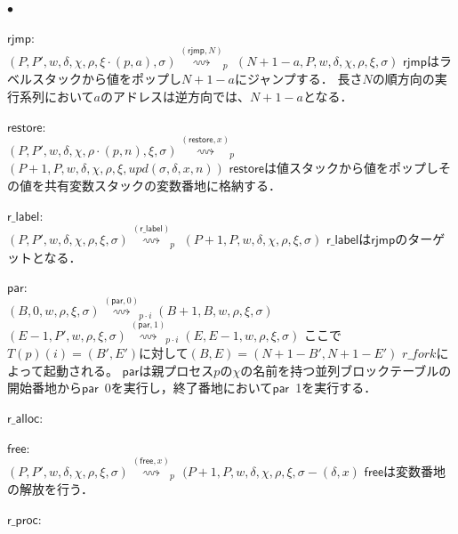 \documentclass[submit,PRO]{ipsj}
\newcommand{\bcode}[1]{$\mathsf{#1}$}
\newcommand{\brightarrow}[1]{\stackrel{#1}{\rightsquigarrow}}
\begin{document}
\begin{list}%
 {$\bullet$} %
 {} %
 \item \bcode{rjmp}:\\
$(P,P',w,\delta,\chi,\rho,\xi\cdot(p,a),\sigma)\brightarrow{(\mathsf{rjmp},N)}_p$\newline
\qquad$(N+1-a,P,w,\delta,\chi,\rho,\xi,\sigma)$\newline
\bcode{rjmp}はラベルスタックから値をポップし$N+1-a$にジャンプする．
長さ$N$の順方向の実行系列において$a$のアドレスは逆方向では、$N+1-a$となる．
\item \bcode{restore}:\\
$(P,P',w,\delta,\chi,\rho\cdot(p,n),\xi,\sigma)\brightarrow{(\mathsf{restore},x)}_p$\newline
\qquad$(P+1,P,w,\delta,\chi,\rho,\xi,upd(\sigma,\delta,x,n))$\newline
\bcode{restore}は値スタックから値をポップしその値を共有変数スタックの変数番地に格納する．
\item \bcode{r\_label}:\\
$(P,P',w,\delta,\chi,\rho,\xi,\sigma)\brightarrow{(\mathsf{r\_label})}_p$
\newline
$(P+1,P,w,\delta,\chi,\rho,\xi,\sigma)$\newline
\bcode{r\_label}は\bcode{rjmp}のターゲットとなる．
\item \bcode{par}:\\
$(B,0,w,\rho,\xi,\sigma)\brightarrow{(\mathsf{par},0)}_{p\cdot i}(B+1,B,w,\rho,\xi,\sigma)$\newline
$(E-1,P',w,\rho,\xi,\sigma)\brightarrow{(\mathsf{par},1)}_{p\cdot i}(E,E-1,w,\rho,\xi,\sigma)$\newline
ここで$T(p)(i)=(B',E')$に対して$(B,E)=(N+1-B',N+1-E')$ $r\_fork$によって起動される。
\bcode{par}は親プロセス$p$の$\chi$の名前を持つ並列ブロックテーブルの開始番地から\bcode{par}\ 0を実行し，終了番地において\bcode{par}\ 1を実行する．
\item \bcode{r\_alloc}:\\
\item \bcode{free}:\\
$(P,P',w,\delta,\chi,\rho,\xi,\sigma)\brightarrow{(\mathsf{free},x)}_p$\newline
\qquad $(P+1,P,w,\delta,\chi,\rho,\xi,\sigma-(\delta,x)$\newline
\bcode{free}は変数番地の解放を行う．
\item \bcode{r\_proc}:\\

\end{list}
\end{document}
